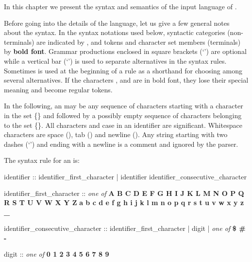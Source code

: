 
In this chapter we present the syntax and semantics of the input
language of \nusmv.

Before going into the details of the language, let us give a few general
notes about the syntax.
%
In the syntax notations used below, syntactic categories
(non-terminals) are indicated by , and tokens
and character set members (terminals) by \textbf{bold font}.
%
Grammar productions enclosed in square brackets (`\grammar{[]}') are
optional while a vertical bar (`\grammar{|}') is used to separate
alternatives in the syntax rules. Sometimes  is used
at the beginning of a rule as a shorthand for choosing among several
alternatives.
%
If the characters \grammar{\textbf{|}}, \grammar{\textbf{[}} and
\grammar{\textbf{]}} are in bold font, they lose their special
meaning and become regular tokens.

In the following, an  may be any sequence of
characters starting with a character in the set
\{{}\}
%
and followed by a possibly empty sequence of characters belonging to
the set
%
\{{}\}.
%
All characters and case in an identifier are significant. Whitespace
characters are space (\spc), tab (\tab) and newline (\ret).
%
Any string  starting with two
dashes (`\code{--}') and ending with a newline is a comment and
ignored by the parser.

The syntax rule for an  is:

\begin{Grammar}
identifier :: 
        identifier_first_character
      | identifier identifier_consecutive_character

identifier_first_character :: \emph{one of}
        \textbf{A B C D E F G H I J K L M N O P Q R S T U V W X Y Z}
        \textbf{a b c d e f g h i j k l m n o p q r s t u v w x y z _}

identifier_consecutive_character :: 
        identifier_first_character
      | digit
      | \emph{one of} \textbf{\$ \# -}

digit :: \emph{one of} \textbf{0 1 2 3 4 5 6 7 8 9}
\end{Grammar}

